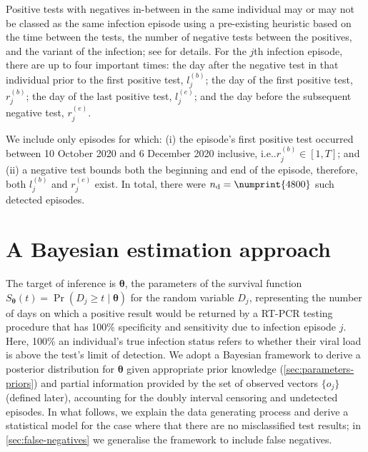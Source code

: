 \documentclass[12pt]{article}
\makeatletter
\DeclareMathOperator{\prob}{\mathrm{Pr}}
\renewcommand{\vec}[1]{\bm{#1}}
\newcommand{\ndet}{n_\text{d}}
\DeclareRobustCommand\onedot{\futurelet\@let@token\@onedot}
\def\@onedot{\ifx\@let@token.\else.\null\fi\xspace}
\def\ie{i.e\onedot} \def\Ie{{I.e}\onedot}
\makeatother
\begin{document}
Positive tests with negatives in-between in the same individual may or may not be classed as the same infection episode using a pre-existing heuristic based on the time between the tests, the number of negative tests between the positives, and the variant of the infection; see \citet{weiRisk} for details.
For the $j$th infection episode, there are up to four important times: the day after the negative test in that individual prior to the first positive test, $l_j^{(b)}$; the day of the first positive test, $r_j^{(b)}$; the day of the last positive test, $l_j^{(e)}$; and the day before the subsequent negative test, $r_j^{(e)}$.

We include only episodes for which: (i) the episode's first positive test occurred between 10 October 2020 and 6 December 2020 inclusive, \ie $r_j^{(b)} \in [1, T]$; and (ii) a negative test bounds both the beginning and end of the episode,
therefore, both $l_j^{(b)}$ and $r_j^{(e)}$ exist.
In total, there were $\ndet = \numprint{4800}$ such detected episodes.


\section{A Bayesian estimation approach} \label{sec:modelling}

The target of inference is $\vec{\theta}$, the parameters of the survival function $S_{\vec{\theta}}(t) = \prob(D_j \geq t \mid \vec\theta)$ for the random variable $D_j$, representing the number of days on which a positive result would be returned by a RT-PCR testing procedure that has 100\% specificity and sensitivity due to infection episode $j$.
Here, 100\% an individual's true infection status refers to whether their viral load is above the test's limit of detection.
We adopt a Bayesian framework to derive a posterior distribution for $\vec{\theta}$ given appropriate prior knowledge (\cref{sec:parameters-priors}) and partial information provided by the set of observed vectors $\{ o_j \}$ (defined later), accounting for the doubly interval censoring and undetected episodes.
In what follows, we explain the data generating process and derive a statistical model for the case where that there are no misclassified test results; in \cref{sec:false-negatives} we generalise the framework to include false negatives.
\end{document}
